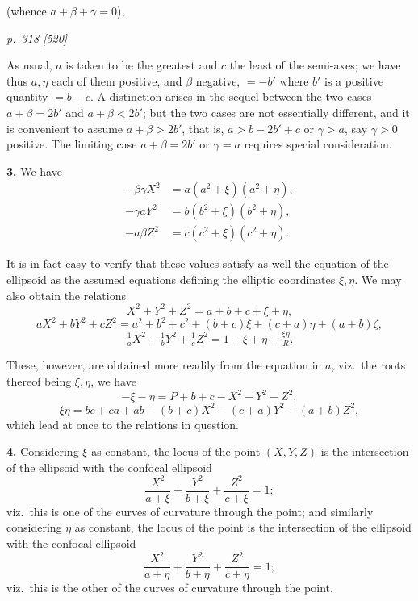 \documentclass[11pt,a4paper]{article}
\theoremstyle{plain}
\theoremstyle{definition}
\begin{document}
(whence $a + \beta + \gamma = 0$),

\clearpage

\bigskip
\textit{p.~318 [520]}
\smallskip

As usual, $a$ is taken to be the greatest and $c$ the least of the semi-axes; we have thus $a, \eta$ each of them positive, and $\beta$ negative, $=-b'$ where $b'$ is a positive quantity $=b - c$. A distinction arises in the sequel between the two cases $a + \beta = 2b'$ and $a + \beta < 2b'$; but the two cases are not essentially different, and it is convenient to assume $a + \beta > 2b'$, that is, $a > b - 2b' + c$ or $\gamma > a$, say $\gamma > 0$ positive. The limiting case $a + \beta = 2b'$ or $\gamma = a$ requires special consideration.

\textbf{3.} We have
\begin{align*}
-\beta\gamma X^2 &= a(a^2 + \xi)(a^2 + \eta),\\
-\gamma a Y^2 &= b(b^2 + \xi)(b^2 + \eta),\\
-a\beta Z^2 &= c(c^2 + \xi)(c^2 + \eta).
\end{align*}

It is in fact easy to verify that these values satisfy as well the equation of the ellipsoid as the assumed equations defining the elliptic coordinates $\xi, \eta$. We may also obtain the relations
\[
X^2 + Y^2 + Z^2 = a + b + c + \xi + \eta,
\]
\[
aX^2 + bY^2 + cZ^2 = a^2 + b^2 + c^2 + (b + c)\xi + (c + a)\eta + (a + b)\zeta,
\]
\[
\tfrac{1}{a}X^2 + \tfrac{1}{b}Y^2 + \tfrac{1}{c}Z^2 = 1 + \xi + \eta + \tfrac{\xi\eta}{R}.
\]

These, however, are obtained more readily from the equation in $a$, viz.\ the roots thereof being $\xi, \eta$, we have
\[
-\xi - \eta = P + b + c - X^2 - Y^2 - Z^2,
\]
\[
\xi\eta = bc + ca + ab - (b + c)X^2 - (c + a)Y^2 - (a + b)Z^2,
\]
which lead at once to the relations in question.

\textbf{4.} Considering $\xi$ as constant, the locus of the point $(X, Y, Z)$ is the intersection of the ellipsoid with the confocal ellipsoid
\[
\frac{X^2}{a + \xi} + \frac{Y^2}{b + \xi} + \frac{Z^2}{c + \xi} = 1;
\]
viz.\ this is one of the curves of curvature through the point; and similarly considering $\eta$ as constant, the locus of the point is the intersection of the ellipsoid with the confocal ellipsoid
\[
\frac{X^2}{a + \eta} + \frac{Y^2}{b + \eta} + \frac{Z^2}{c + \eta} = 1;
\]
viz.\ this is the other of the curves of curvature through the point.
\end{document}
